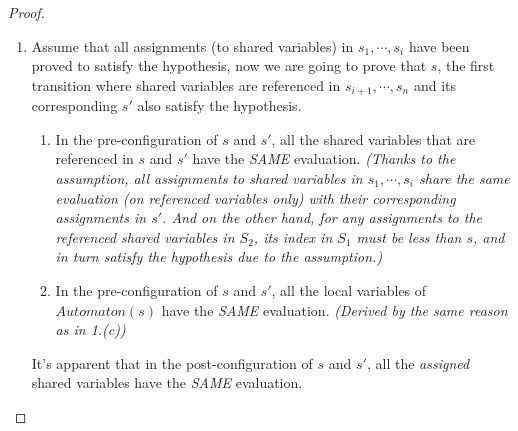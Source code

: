 \begin{proof}
\begin{enumerate}
        \item Assume that all assignments (to shared variables) in $s_1,\cdots,s_i$ have been proved to satisfy the hypothesis, now we are going to prove that $s$, the first transition where shared variables are referenced in $s_{i+1},\cdots,s_n$ and its corresponding $s'$ also satisfy the hypothesis.

        \begin{enumerate}
            \item In the pre-configuration of $s$ and $s'$, all the shared variables that are referenced in $s$ and $s'$ have the \emph{SAME} evaluation. \emph{(Thanks to the assumption, all assignments to shared variables in $s_1,\cdots,s_i$ share the same evaluation (on referenced variables only) with their corresponding assignments in $s'$. And on the other hand, for any assignments to the referenced shared variables in $S_2$, its index in $S_1$ must be less than $s$, and in turn satisfy the hypothesis due to the assumption.)}
            \item In the pre-configuration of $s$ and $s'$, all the local variables of $Automaton(s)$ have the \emph{SAME} evaluation. \emph{(Derived by the same reason as in 1.(c))}
        \end{enumerate}

        It's apparent that in the post-configuration of $s$ and $s'$, all the \emph{assigned} shared variables have the \emph{SAME} evaluation.
    \end{enumerate}
\end{proof}
